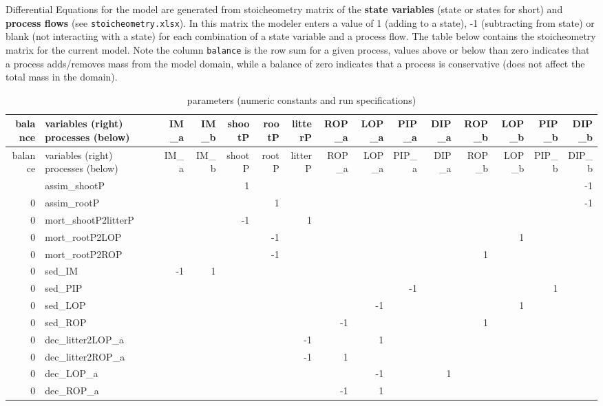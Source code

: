 \documentclass[
]{article}
\begin{document}
Differential Equations for the model are generated from stoicheometry
matrix of the \textbf{state variables} (state or states for short) and
\textbf{process flows} (see \texttt{stoicheometry.xlsx}). In this matrix
the modeler enters a value of 1 (adding to a state), -1 (subtracting
from state) or blank (not interacting with a state) for each combination
of a state variable and a process flow. The table below contains the
stoicheometry matrix for the current model. Note the column
\texttt{balance} is the row sum for a given process, values above or
below than zero indicates that a process adds/removes mass from the
model domain, while a balance of zero indicates that a process is
conservative (does not affect the total mass in the domain).

\begin{longtable}[]{@{}rlrrrrrrrrrrrrr@{}}
\caption{parameters (numeric constants and run
specifications)}\tabularnewline
\toprule\noalign{}
balance & variables (right) processes (below) & IM\_a & IM\_b & shootP &
rootP & litterP & ROP\_a & LOP\_a & PIP\_a & DIP\_a & ROP\_b & LOP\_b &
PIP\_b & DIP\_b \\
\midrule\noalign{}
\endfirsthead
\toprule\noalign{}
balance & variables (right) processes (below) & IM\_a & IM\_b & shootP &
rootP & litterP & ROP\_a & LOP\_a & PIP\_a & DIP\_a & ROP\_b & LOP\_b &
PIP\_b & DIP\_b \\
\midrule\noalign{}
\endhead
\bottomrule\noalign{}
\endlastfoot
0 & assim\_shootP & & & 1 & & & & & & & & & & -1 \\
0 & assim\_rootP & & & & 1 & & & & & & & & & -1 \\
0 & mort\_shootP2litterP & & & -1 & & 1 & & & & & & & & \\
0 & mort\_rootP2LOP & & & & -1 & & & & & & & 1 & & \\
0 & mort\_rootP2ROP & & & & -1 & & & & & & 1 & & & \\
0 & sed\_IM & -1 & 1 & & & & & & & & & & & \\
0 & sed\_PIP & & & & & & & & -1 & & & & 1 & \\
0 & sed\_LOP & & & & & & & -1 & & & & 1 & & \\
0 & sed\_ROP & & & & & & -1 & & & & 1 & & & \\
0 & dec\_litter2LOP\_a & & & & & -1 & & 1 & & & & & & \\
0 & dec\_litter2ROP\_a & & & & & -1 & 1 & & & & & & & \\
0 & dec\_LOP\_a & & & & & & & -1 & & 1 & & & & \\
0 & dec\_ROP\_a & & & & & & -1 & 1 & & & & & & \\

\end{longtable}
\end{document}
